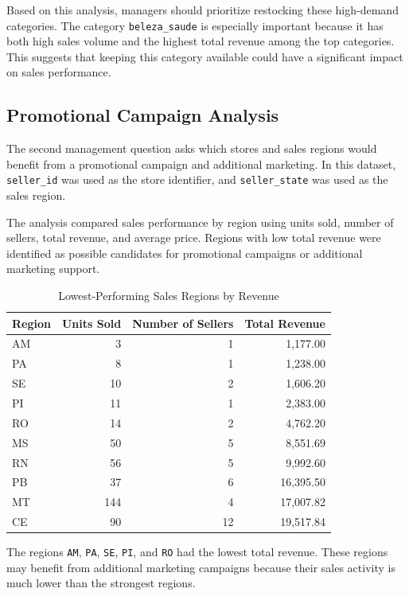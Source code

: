 \documentclass[12pt]{article}
\begin{document}
Based on this analysis, managers should prioritize restocking these high-demand
categories. The category \texttt{beleza\_saude} is especially important because it
has both high sales volume and the highest total revenue among the top categories.
This suggests that keeping this category available could have a significant impact
on sales performance.


\subsection{Promotional Campaign Analysis}

The second management question asks which stores and sales regions would benefit
from a promotional campaign and additional marketing. In this dataset,
\texttt{seller\_id} was used as the store identifier, and \texttt{seller\_state}
was used as the sales region.

The analysis compared sales performance by region using units sold, number of
sellers, total revenue, and average price. Regions with low total revenue were
identified as possible candidates for promotional campaigns or additional
marketing support.

\begin{table}[H]
\centering
\begin{tabular}{lrrr}
\toprule
Region & Units Sold & Number of Sellers & Total Revenue \\
\midrule
AM & 3 & 1 & 1,177.00 \\
PA & 8 & 1 & 1,238.00 \\
SE & 10 & 2 & 1,606.20 \\
PI & 11 & 1 & 2,383.00 \\
RO & 14 & 2 & 4,762.20 \\
MS & 50 & 5 & 8,551.69 \\
RN & 56 & 5 & 9,992.60 \\
PB & 37 & 6 & 16,395.50 \\
MT & 144 & 4 & 17,007.82 \\
CE & 90 & 12 & 19,517.84 \\
\bottomrule
\end{tabular}
\caption{Lowest-Performing Sales Regions by Revenue}
\end{table}

The regions \texttt{AM}, \texttt{PA}, \texttt{SE}, \texttt{PI}, and
\texttt{RO} had the lowest total revenue. These regions may benefit from
additional marketing campaigns because their sales activity is much lower than
the strongest regions.
\end{document}
